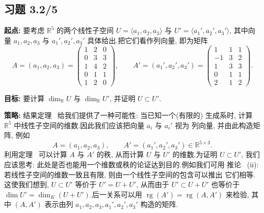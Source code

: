 \subsection*{习题 3.2/5}

\noindent\textbf{起点:} 要考虑 $\mathbb{R}^5$ 的两个线性子空间
$U = \langle a_1, a_2, a_3 \rangle$ 与 $U' = \langle a_1', a_2', a_3' \rangle$, 其中向量
$a_1, a_2, a_3$ 与 $a_1', a_2', a_3'$ 具体给出.把它们看作列向量, 即为矩阵
\[
A = (a_1, a_2, a_3) = \begin{pmatrix} 1 & 2 & 0 \\ 0 & 3 & 3 \\ 1 & 4 & 2 \\ 0 & 1 & 1 \\ 1 & 2 & 0 \end{pmatrix},
\qquad
A' = (a_1', a_2', a_3') = \begin{pmatrix} 1 & 1 & 1 \\ -1 & 3 & 2 \\ 1 & 3 & 3 \\ 0 & 1 & 1 \\ 2 & 1 & 2 \end{pmatrix}\text{.}
\]

\noindent\textbf{目标:} 要计算 $\dim_{\mathbb{R}} U$ 与 $\dim_{\mathbb{R}} U'$, 并证明
$U \subset U'$.

\noindent\textbf{策略:} 结果定理~ 给我们提供了一种可能性: 当已知一个(有限的)
生成系时, 计算 $\mathbb{R}^5$ 中线性子空间的维数.因此我们应该把向量 $a_i$ 与 $a_i'$ 视为
列向量, 并由此构造矩阵, 例如
\[
A = (a_1, a_2, a_3), \qquad A' = (a_1', a_2', a_3') \in \mathbb{R}^{5 \times 3}\text{.}
\]
利用定理~ 可以计算 $A$ 与 $A'$ 的秩, 从而计算 $U$ 与 $U'$ 的维数.为证明
$U \subset U'$, 我们应该思考: 此处是否也能用一个维数或秩的论证达到目的.例如我们可用
推论~ (ii): 若线性子空间的维数一致且有限, 则由一个线性子空间的包含可以推出
它们相等.这使我们想到, $U \subset U'$ 等价于 $U' = U + U'$, 从而由于 $U' \subset U + U'$
也等价于 $\dim U' = \dim_K(U + U')$.后一关系可以用 $\operatorname{rg}(A') = \operatorname{rg}(A, A')$
来检验, 其中 $(A, A')$ 表示由列 $a_1, a_2, a_3, a_1', a_2', a_3'$ 构造的矩阵.

